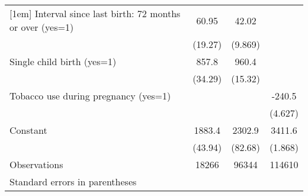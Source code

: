 \begin{tabular}{l*{3}{c}}
[1em]
Interval since last birth: 72 months or over (yes=1)&       60.95&       42.02&            \\
                    &     (19.27)&     (9.869)&            \\
[1em]
Single child birth (yes=1)&       857.8&       960.4&            \\
                    &     (34.29)&     (15.32)&            \\
[1em]
Tobacco use during pregnancy (yes=1)&            &            &      -240.5\\
                    &            &            &     (4.627)\\
[1em]
Constant            &      1883.4&      2302.9&      3411.6\\
                    &     (43.94)&     (82.68)&     (1.868)\\
\hline
Observations        &       18266&       96344&      114610\\
\hline\hline
\multicolumn{4}{l}{\footnotesize Standard errors in parentheses}\\
\end{tabular}
